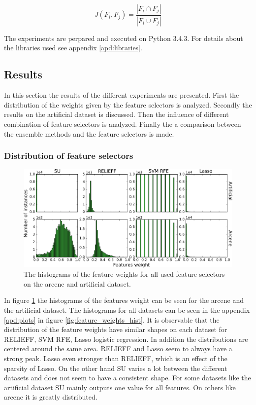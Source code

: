 \documentclass[twoside,11pt]{article}
\begin{document}
\begin{equation}
J(F_i, F_j) = \frac{| F_i \cap F_j |}{| F_i \cup F_j |}
\end{equation}

The experiments are perpared and executed on Python 3.4.3. For details about the libraries used see appendix \ref{apd:libraries}.

\subsection{Results}
In this section the results of the different experiments are presented. First the distribution of the weights given by the feature selectors is analyzed. Secondly the results on the artificial dataset is discussed. Then the influence of different combination of feature selectors is analyzed. Finally the a comparison between the ensemble methods and the feature selectors is made.

\subsubsection{Distribution of feature selectors}
\begin{figure}[h!]
  \centering
    \includegraphics[width=\textwidth]{images/feature_weights_hist_arcene_artificial.png}
  \caption{The histograms of the feature weights for all used feature selectors on the arcene and artificial dataset.}
  \label{fig:feature_weights_hist_arcene_artificial}
\end{figure}

In figure \ref{fig:feature_weights_hist_arcene_artificial} the histograms of the features weight can be seen for the arcene and the artificial dataset. The histograms for all datasets can be seen in the appendix \ref{apd:plots} in figure \ref{fig:feature_weights_hist}.
It is observable that the distribution of the feature weights have similar shapes on each dataset for RELIEFF, SVM RFE, Lasso logistic regression. In addition the distributions are centered around the same area. RELIEFF and Lasso seem to always have a strong peak. Lasso even stronger than RELIEFF, which is an effect of the sparsity of Lasso. On the other hand SU varies a lot between the different datasets and does not seem to have a consistent shape. For some datasets like the artificial dataset SU mainly outputs one value for all features. On others like arcene it is greatly distributed. 
\end{document}
